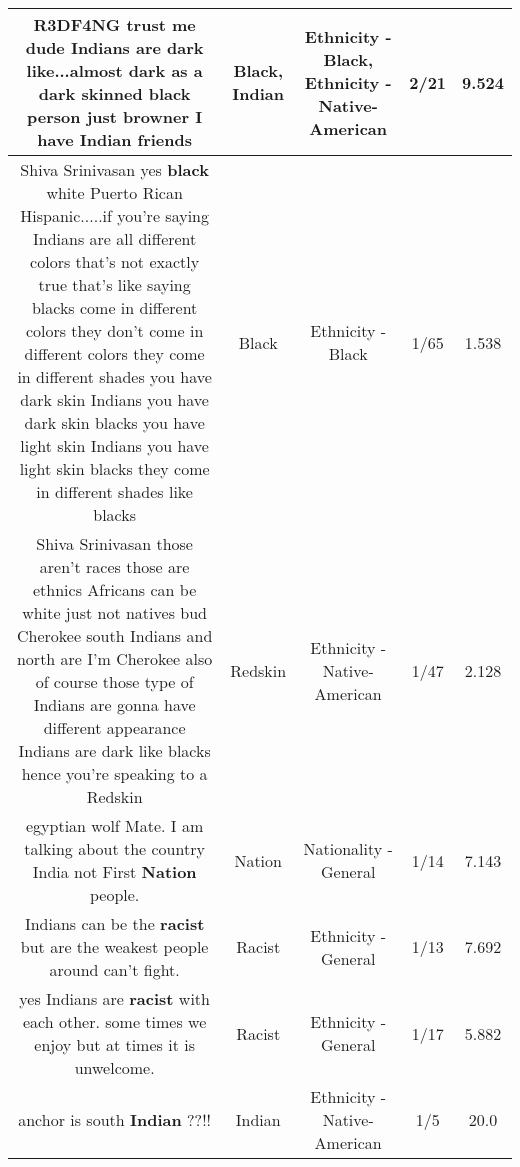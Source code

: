 \documentclass[11pt]{article}
\newlength\mylength
\begin{document}
\begin{center}
\begin{longtable}{|C{.65\mylength}|C{.30\mylength}|C{.12\mylength}|C{.12\mylength}|C{.12\mylength}|}
  \small R3DF4NG trust me dude Indians are dark like...almost dark as a dark skinned \textbf{black} person just browner I have \textbf{Indian} friends\normalsize   & Black, Indian & Ethnicity - Black, Ethnicity - Native-American & 2/21 & 9.524 \\  \hline
  \small Shiva Srinivasan yes \textbf{black} white Puerto Rican Hispanic.....if you're saying Indians are all different colors that's not exactly true that's like saying blacks come in different colors they don't come in different colors they come in different shades you have  dark skin Indians you have dark skin blacks you have light skin Indians you have light skin blacks they come in different shades like blacks\normalsize   & Black & Ethnicity - Black & 1/65 & 1.538 \\  \hline
  \small Shiva Srinivasan those aren't races those are ethnics Africans can be white just not natives  bud Cherokee south Indians and north are I'm Cherokee also of course those type of Indians are gonna have different appearance  Indians are dark like blacks hence you're speaking to a Redskin\normalsize   & Redskin & Ethnicity - Native-American & 1/47 & 2.128 \\  \hline
  \small egyptian wolf Mate. I am talking about the country India not First \textbf{Nation} people.\normalsize   & Nation & Nationality - General & 1/14 & 7.143 \\  \hline
  \small Indians can be the \textbf{racist} but are the weakest people around can't fight.\normalsize   & Racist & Ethnicity - General & 1/13 & 7.692 \\  \hline
  \small yes Indians are \textbf{racist} with each other. some times we enjoy but at times it is unwelcome.\normalsize   & Racist & Ethnicity - General & 1/17 & 5.882 \\  \hline
  \small anchor is south \textbf{Indian} ??!!\normalsize   & Indian & Ethnicity - Native-American & 1/5 & 20.0 \\  \hline

\end{longtable}
\end{center}
\end{document}
